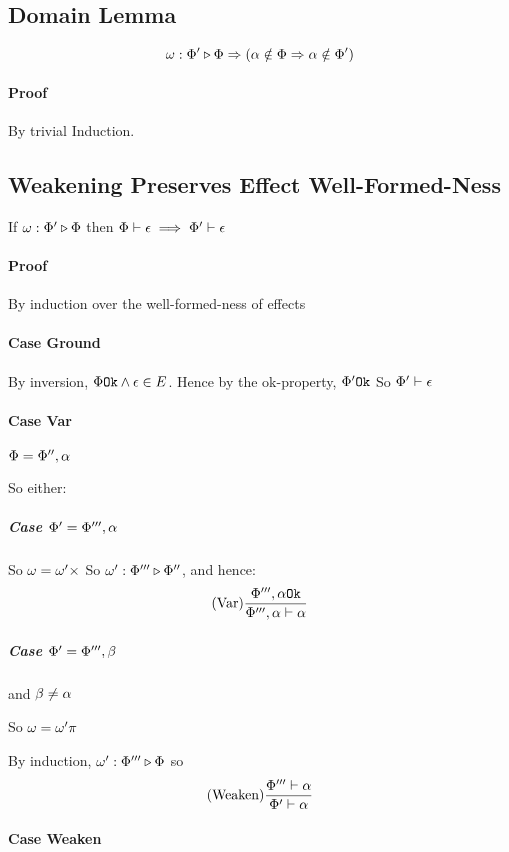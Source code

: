 \documentclass{report}
\newcommand\wrelw[2]{\wrel{\w}{#1}{#2}}
\newcommand\bi[0]{By inversion}
\begin{document}
\subsection{Domain Lemma}

$$\wrelw{\P'}{\P} \Rightarrow (\a\notin\P \Rightarrow \a\notin\P')$$

\paragraph{Proof}
By trivial Induction.

\subsection{Weakening Preserves Effect Well-Formed-Ness}
If $\wrelw{\P'}{\P}$ then $\Phi\vdash \epsilon\implies\Phi'\vdash \epsilon$

\paragraph{Proof}
By induction over the well-formed-ness of effects
\paragraph{Case Ground}
\bi, $\Phi \texttt{Ok}\wedge\epsilon\in E$.
Hence by the ok-property, $\Phi' \texttt{Ok}$
So $\Phi'\vdash \epsilon$

\paragraph{Case Var}

$\Phi = \Phi'', \alpha$

So either:

\subparagraph{Case $\Phi' = \Phi''', \alpha$}
    So $\omega = \omega'\times$
    So $\omega' : \Phi''' \triangleright \Phi''$, and hence:
    \begin{equation}
        (\text{Var}) \frac{\Phi''', \alpha \texttt{Ok}}{\Phi''',\alpha\vdash \alpha}
    \end{equation}
\subparagraph{Case $\Phi' = \Phi''', \beta$} and $\beta \neq\alpha$

So $\omega = \omega'\pi$

By induction, $\omega' : \Phi''' \triangleright \Phi$
so \begin{equation}
    (\text{Weaken}) \frac{\Phi'''\vdash \alpha}{\Phi'\vdash \alpha}
\end{equation}

\paragraph{Case Weaken}
\end{document}
